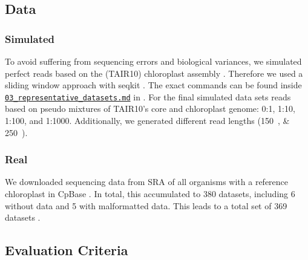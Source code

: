 \documentclass{bmcart}
\newcommand{\zenododataset}{\cite{zenododataset}}
\begin{document}
\subsection*{Data}
\subsubsection*{Simulated}
To avoid suffering from sequencing errors and biological variances, we simulated perfect reads based on the  (TAIR10) chloroplast assembly \cite{tair10}.
Therefore we used a sliding window approach with seqkit \cite{seqkit}. The exact commands can be found inside \href{https://github.com/chloroExtractorTeam/benchmark/blob/master/03_representative_datasets.md}{\texttt{03\_representative\_datasets.md}} in \zenododataset{}.
For the final simulated data sets reads based on pseudo mixtures of TAIR10's core and chloroplast genome:  \num{0}:\num{1}, \num{1}:\num{10}, \num{1}:\num{100}, and \num{1}:\num{1000}.
Additionally, we generated different read lengths (\SIlist{150;250}{\basepair}).


\subsubsection*{Real}
We downloaded sequencing data from SRA \cite{sra2010} of all organisms with a reference
chloroplast in CpBase \cite{cpbase}. In total, this accumulated to \num{380} datasets, including \num{6} without data and \num{5} with malformatted data. This leads to a total set of \num{369} datasets .

\subsection*{Evaluation Criteria}
\end{document}
